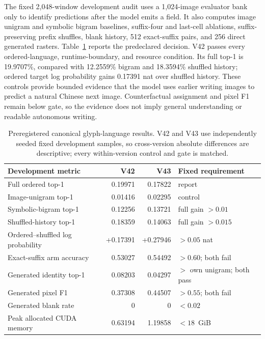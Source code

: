 \documentclass[11pt]{article}
\begin{document}
The fixed 2,048-window development audit uses a 1,024-image evaluator bank only
to identify predictions after the model emits a field. It also computes image
unigram and symbolic bigram baselines, suffix-four and last-cell ablations,
suffix-preserving prefix shuffles, blank history, 512 exact-suffix pairs, and
256 direct generated rasters. Table~\ref{tab:v42v43language} reports the
predeclared decision. V42 passes every ordered-language, runtime-boundary, and
resource condition. Its full top-1 is 19.9707\%, compared with 12.2559\%
bigram and 18.3594\% shuffled history; ordered target log probability gains
0.17391 nat over shuffled history. These controls provide bounded evidence that
the model uses earlier writing images to predict a natural Chinese next image.
Counterfactual assignment and pixel F1 remain below gate, so the evidence does
not imply general understanding or readable autonomous writing.

\begin{table}[h!]
\centering
\small
\begin{tabular}{lrrl}
\toprule
Development metric & V42 & V43 & Fixed requirement \\
\midrule
Full ordered top-1 & 0.19971 & 0.17822 & report \\
Image-unigram top-1 & 0.01416 & 0.02295 & control \\
Symbolic-bigram top-1 & 0.12256 & 0.13721 & full gain $>0.01$ \\
Shuffled-history top-1 & 0.18359 & 0.14063 & full gain $>0.015$ \\
Ordered--shuffled log probability & +0.17391 & +0.27946 & $>0.05$ nat \\
Exact-suffix arm accuracy & 0.53027 & 0.54492 & $>0.60$; both fail \\
Generated identity top-1 & 0.08203 & 0.04297 & $>$ own unigram; both pass \\
Generated pixel F1 & 0.37308 & 0.44507 & $>0.55$; both fail \\
Generated blank rate & 0 & 0 & $<0.02$ \\
Peak allocated CUDA memory & 0.63194 & 1.19858 & $<18$~GiB \\
\bottomrule
\end{tabular}
\caption{Preregistered canonical glyph-language results. V42 and V43 use
independently seeded fixed development samples, so cross-version absolute
differences are descriptive; every within-version control and gate is matched.}
\label{tab:v42v43language}
\end{table}
\end{document}
